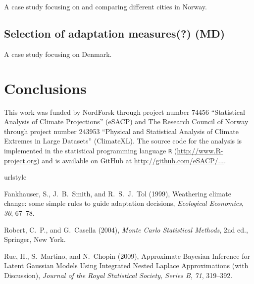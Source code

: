 \documentclass[wrr, draft]{agutex}
\begin{document}
\begin{article}
A case study focusing on and comparing different cities in Norway.

\subsection{Selection of adaptation measures(?) {\color{blue} (MD)}}

A case study focusing on Denmark. 

\section{Conclusions}

\begin{acknowledgments}
This work was funded by NordForsk through project number 74456 ``Statistical Analysis of Climate Projections'' (eSACP) and The Research Council of Norway through project number 243953 ``Physical and Statistical Analysis of Climate Extremes in Large Datasets'' (ClimateXL). The source code for the analysis is implemented in the statistical programming language {\tt R} (\url{http://www.R-project.org}) and is available on GitHub at \url{http://github.com/eSACP/...}.
\end{acknowledgments}


% 

\begin{thebibliography}{37}
\providecommand{\natexlab}[1]{#1}
\expandafter\ifx\csname urlstyle\endcsname\relax
  \providecommand{\doi}[1]{doi:\discretionary{}{}{}#1}\else
  \providecommand{\doi}{doi:\discretionary{}{}{}\begingroup
  \urlstyle{rm}\Url}\fi

  Fankhauser, S., J.~B.~Smith, and R.~S.~J.~Tol (1999), {Weathering climate
    change: some simple rules to guide adaptation decisions},
  \textit{Ecological Economics}, \textit{30}, 67--78.
  
Robert, C.~P., and G.~Casella (2004), \textit{Monte Carlo Statistical Methods},
  2nd ed., Springer, New York.

Rue, H., S.~Martino, and N.~Chopin (2009), {Approximate {B}ayesian Inference
  for Latent {G}aussian Models Using Integrated Nested {L}aplace Approximations
  (with Discussion)}, \textit{Journal of the Royal Statistical Society, Series
  B}, \textit{71}, 319--392.


\end{thebibliography}

\end{article}

\end{document}

